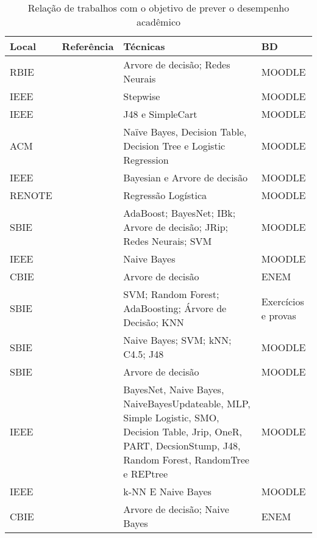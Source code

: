 \documentclass[ti]{texufpel} %
\begin{document}
\begin{table}
\begin{center}
\caption{Relação de trabalhos com o objetivo de prever o desempenho acadêmico}\label{relacao-trabalhos-desempenho}
\begin{tabular}{p{1.4cm}|p{7cm}|p{4cm}|p{1.5cm}}
\hline
Local & Referência & Técnicas & BD \\
\hline
{\small RBIE} & {\small\em \citet{gottardo2014estimativa}} & {\small Arvore de decisão; Redes Neurais} & {\small MOODLE} \\
{\small IEEE} & {\small\em \citet{de2014monitoring}} & {\small Stepwise} & {\small MOODLE} \\
{\small IEEE} & {\small\em \citet{grivokostopoulou2014utilizing}} & {\small J48 e SimpleCart} & {\small MOODLE} \\
{\small ACM} & {\small\em \citet{tamhane2014predicting}} & {\small Naïve Bayes, Decision Table, Decision Tree e Logistic Regression} & {\small MOODLE} \\
{\small IEEE} & {\small\em \citet{guarin2015model}} & {\small Bayesian e Arvore de decisão} & {\small MOODLE} \\
{\small RENOTE} & {\small\em \citet{silva2016mineraccao}} & {\small Regressão Logística} & {\small MOODLE} \\
{\small SBIE} & {\small\em \citet{santos2016uso}} & {\small AdaBoost; BayesNet; IBk; Arvore de decisão; JRip; Redes Neurais; SVM} & {\small MOODLE} \\
{\small IEEE} & {\small\em \citet{devasia2016prediction}} & {\small Naive Bayes} & {\small MOODLE} \\
{\small CBIE} & {\small\em \citet{simon2017mineraccao}} & {\small Arvore de decisão} & {\small ENEM} \\
{\small SBIE} & {\small\em \citet{dwan2017prediccao}} & {\small SVM; Random Forest; AdaBoosting; Árvore de Decisão; KNN} & {\small Exercícios e provas} \\
{\small SBIE} & {\small\em \citet{ramos2017modelo}} & {\small Naive Bayes; SVM; kNN; C4.5; J48} & {\small MOODLE} \\
{\small SBIE} & {\small\em \citet{rabelo2017utilizaccao}} & {\small Arvore de decisão} & {\small MOODLE} \\
{\small IEEE} & {\small\em \citet{zaffar2017performance}} & {\small BayesNet, Naive Bayes, NaiveBayesUpdateable, MLP, Simple Logistic, SMO, Decision Table, Jrip, OneR, PART, DecsionStump, J48, Random Forest, RandomTree e REPtree} & {\small MOODLE} \\
{\small IEEE} & {\small\em \citet{amra2017students}} & {\small k-NN E Naive Bayes} & {\small MOODLE} \\
{\small CBIE} & {\small\em \citet{alves2018prediccao}} & {\small Arvore de decisão; Naive Bayes} & {\small ENEM} \\
\hline
\end{tabular}
\end{center}
\end{table}
\end{document}
